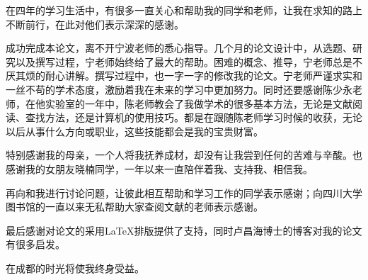 \announcement

\begin{ack}
在四年的学习生活中，有很多一直关心和帮助我的同学和老师，让我在求知的路上不断前行，在此对他们表示深深的感谢。

成功完成本论文，离不开宁波老师的悉心指导。几个月的论文设计中，从选题、研究以及撰写过程，宁老师始终给了最大的帮助。困难的概念、推导，宁老师总是不厌其烦的耐心讲解。撰写过程中，也一字一字的修改我的论文。宁老师严谨求实和一丝不苟的学术态度，激励着我在未来的学习中更加努力。同时还要感谢陈少永老师，在他实验室的一年中，陈老师教会了我做学术的很多基本方法，无论是文献阅读、查找方法，还是计算机的使用技巧。都是在跟随陈老师学习时候的收获，无论以后从事什么方向或职业，这些技能都会是我的宝贵财富。

特别感谢我的母亲，一个人将我抚养成材，却没有让我尝到任何的苦难与辛酸。也感谢我的女朋友晓楠同学，一年以来一直陪伴着我、支持我、相信我。

再向和我进行讨论问题，让彼此相互帮助和学习工作的同学表示感谢；向四川大学图书馆的一直以来无私帮助大家查阅文献的老师表示感谢。

最后感谢\scuthesis{}对论文的采用\LaTeX{}排版提供了支持，同时卢昌海博士的博客对我的论文有很多启发。

在成都的时光将使我终身受益。


\end{ack}